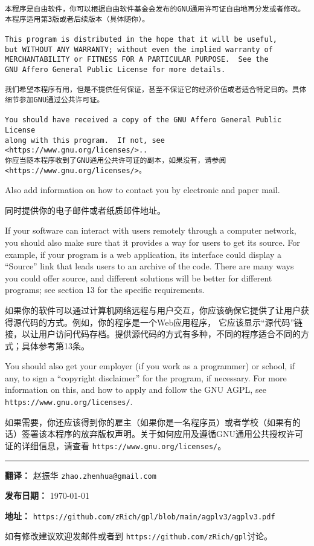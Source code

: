 \documentclass[11pt]{article}
\begin{document}
\begin{enumerate}
{\begin{verbatim}
本程序是自由软件，你可以根据自由软件基金会发布的GNU通用许可证自由地再分发或者修改。本程序适用第3版或者后续版本（具体随你）。

This program is distributed in the hope that it will be useful,
but WITHOUT ANY WARRANTY; without even the implied warranty of
MERCHANTABILITY or FITNESS FOR A PARTICULAR PURPOSE.  See the
GNU Affero General Public License for more details.

我们希望本程序有用，但是不提供任何保证，甚至不保证它的经济价值或者适合特定目的。具体细节参加GNU通过公共许可证。

You should have received a copy of the GNU Affero General Public License
along with this program.  If not, see <https://www.gnu.org/licenses/>..
你应当随本程序收到了GNU通用公共许可证的副本，如果没有，请参阅<https://www.gnu.org/licenses/>。
\end{verbatim}
}

Also add information on how to contact you by electronic and paper mail.

同时提供你的电子邮件或者纸质邮件地址。

If your software can interact with users remotely through a computer
network, you should also make sure that it provides a way for users to
get its source.  For example, if your program is a web application, its
interface could display a ``Source'' link that leads users to an archive
of the code.  There are many ways you could offer source, and different
solutions will be better for different programs; see section 13 for the
specific requirements.

如果你的软件可以通过计算机网络远程与用户交互，你应该确保它提供了让用户获得源代码的方式。例如，你的程序是一个Web应用程序，
它应该显示“源代码”链接，以让用户访问代码存档。提供源代码的方式有多种，不同的程序适合不同的方式；具体参考第13条。

You should also get your employer (if you work as a programmer) or
school, if any, to sign a ``copyright disclaimer'' for the program, if
necessary.  For more information on this, and how to apply and follow
the GNU AGPL, see \texttt{https://www.gnu.org/licenses/}.

如果需要，你还应该得到你的雇主（如果你是一名程序员）或者学校（如果有的话）签署该本程序的放弃版权声明。关于如何应用及遵循GNU通用公共授权许可证的详细信息，请查看 \texttt{https://www.gnu.org/licenses/}。

\end{enumerate}

\vfill

\noindent\rule{\textwidth}{0.4pt}

\textbf{翻译：} 赵振华 \texttt{zhao.zhenhua@gmail.com}

\textbf{发布日期：} \today

\textbf{地址：} \texttt{https://github.com/zRich/gpl/blob/main/agplv3/agplv3.pdf}

如有修改建议欢迎发邮件或者到 \texttt{https://github.com/zRich/gpl}讨论。
\end{document}
